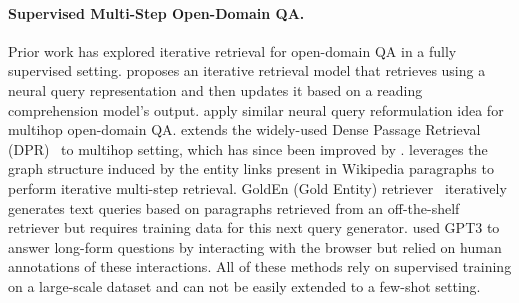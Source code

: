 \paragraph{Supervised Multi-Step Open-Domain QA.}
Prior work has explored iterative retrieval for open-domain QA in a fully supervised setting. \citet{multi-step-retriever-reader} proposes an iterative retrieval model that retrieves using a neural query representation and then updates it based on a reading comprehension model's output. \citet{multihop-retriever-odqa} apply similar neural query reformulation idea for multihop open-domain QA. \citet{mpr} extends the widely-used Dense Passage Retrieval (DPR)~\cite{dpr} to multihop setting, which has since been improved by \citet{baleen}. \citet{wikipatretriever} leverages the graph structure induced by the entity links present in Wikipedia paragraphs to perform iterative multi-step retrieval. GoldEn (Gold Entity) retriever~\cite{golden} iteratively generates text queries based on paragraphs retrieved from an off-the-shelf retriever but requires training data for this next query generator. \citet{webgpt} used GPT3 to answer long-form questions by interacting with the browser but relied on human annotations of these interactions. All of these methods rely on supervised training on a large-scale dataset and can not be easily extended to a few-shot setting.
